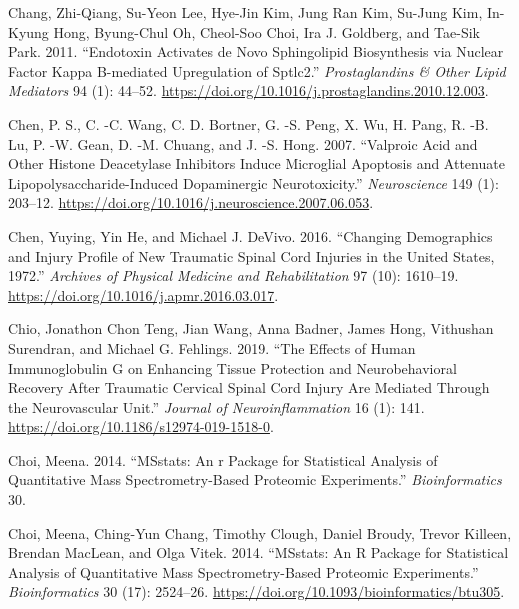 \documentclass[9pt,lineno]{elife}
\newlength{\cslhangindent}
\newlength{\cslentryspacingunit} %
\newenvironment{CSLReferences}[2] %
 {%
  \setlength{\parindent}{0pt}
  \ifodd #1
  \let\oldpar\par
  \def\par{\hangindent=\cslhangindent\oldpar}
  \fi
  \setlength{\parskip}{#2\cslentryspacingunit}
 }%
 {}
\begin{document}
\begin{CSLReferences}{1}{0}
\leavevmode{}%
Chang, Zhi-Qiang, Su-Yeon Lee, Hye-Jin Kim, Jung Ran Kim, Su-Jung Kim, In-Kyung Hong, Byung-Chul Oh, Cheol-Soo Choi, Ira J. Goldberg, and Tae-Sik Park. 2011. {``Endotoxin Activates de Novo Sphingolipid Biosynthesis via Nuclear Factor Kappa {B-mediated} Upregulation of {Sptlc2}.''} \emph{Prostaglandins \& Other Lipid Mediators} 94 (1): 44--52. \url{https://doi.org/10.1016/j.prostaglandins.2010.12.003}.

\leavevmode{}%
Chen, P. S., C. -C. Wang, C. D. Bortner, G. -S. Peng, X. Wu, H. Pang, R. -B. Lu, P. -W. Gean, D. -M. Chuang, and J. -S. Hong. 2007. {``Valproic Acid and Other Histone Deacetylase Inhibitors Induce Microglial Apoptosis and Attenuate Lipopolysaccharide-Induced Dopaminergic Neurotoxicity.''} \emph{Neuroscience} 149 (1): 203--12. \url{https://doi.org/10.1016/j.neuroscience.2007.06.053}.

\leavevmode{}%
Chen, Yuying, Yin He, and Michael J. DeVivo. 2016. {``Changing {Demographics} and {Injury Profile} of {New Traumatic Spinal Cord Injuries} in the {United States}, 1972.''} \emph{Archives of Physical Medicine and Rehabilitation} 97 (10): 1610--19. \url{https://doi.org/10.1016/j.apmr.2016.03.017}.

\leavevmode{}%
Chio, Jonathon Chon Teng, Jian Wang, Anna Badner, James Hong, Vithushan Surendran, and Michael G. Fehlings. 2019. {``The Effects of Human Immunoglobulin {G} on Enhancing Tissue Protection and Neurobehavioral Recovery After Traumatic Cervical Spinal Cord Injury Are Mediated Through the Neurovascular Unit.''} \emph{Journal of Neuroinflammation} 16 (1): 141. \url{https://doi.org/10.1186/s12974-019-1518-0}.

\leavevmode{}%
Choi, Meena. 2014. {``MSstats: An r Package for Statistical Analysis of Quantitative Mass Spectrometry-Based Proteomic Experiments.''} \emph{Bioinformatics} 30.

\leavevmode{}%
Choi, Meena, Ching-Yun Chang, Timothy Clough, Daniel Broudy, Trevor Killeen, Brendan MacLean, and Olga Vitek. 2014. {``{MSstats}: An {R} Package for Statistical Analysis of Quantitative Mass Spectrometry-Based Proteomic Experiments.''} \emph{Bioinformatics} 30 (17): 2524--26. \url{https://doi.org/10.1093/bioinformatics/btu305}.


\end{CSLReferences}
\end{document}
